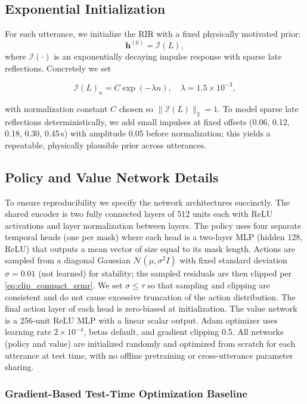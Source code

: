 \documentclass[10pt,conference]{IEEEtran}
\begin{document}
\subsection{Exponential Initialization}

For each utterance, we initialize the RIR with a fixed physically motivated prior:
\begin{equation}
\label{eq:init}
\mathbf{h}^{(0)} = \mathcal{I}(L),
\end{equation}
where \(\mathcal{I}(\cdot)\) is an exponentially decaying impulse response with sparse late reflections. Concretely we set

\[
\mathcal{I}(L)_n = C\exp(-\lambda n),\quad \lambda=1.5\times10^{-3},
\]

with normalization constant \(C\) chosen so \(\|\mathcal{I}(L)\|_2=1\). To model sparse late reflections deterministically, we add small impulses at fixed offsets (0.06, 0.12, 0.18, 0.30, 0.45\,s) with amplitude 0.05 before normalization; this yields a repeatable, physically plausible prior across utterances.

\subsection{Policy and Value Network Details}

To ensure reproducibility we specify the network architectures succinctly. The shared encoder is two fully connected layers of 512 units each with ReLU activations and layer normalization between layers. The policy uses four separate temporal heads (one per mask) where each head is a two-layer MLP (hidden 128, ReLU) that outputs a mean vector of size equal to its mask length. Actions are sampled from a diagonal Gaussian \(\mathcal{N}(\mu,\sigma^2 I)\) with fixed standard deviation \(\sigma=0.01\) (not learned) for stability; the sampled residuals are then clipped per \eqref{eq:clip_compact_srmr}. We set \(\sigma\le\tau\) so that sampling and clipping are consistent and do not cause excessive truncation of the action distribution. The final action layer of each head is zero-biased at initialization. The value network is a 256-unit ReLU MLP with a linear scalar output. Adam optimizer uses learning rate \(2\times10^{-4}\), betas default, and gradient clipping 0.5. All networks (policy and value) are initialized randomly and optimized from scratch for each utterance at test time, with no offline pretraining or cross-utterance parameter sharing.

\subsubsection{Gradient-Based Test-Time Optimization Baseline}
\end{document}
